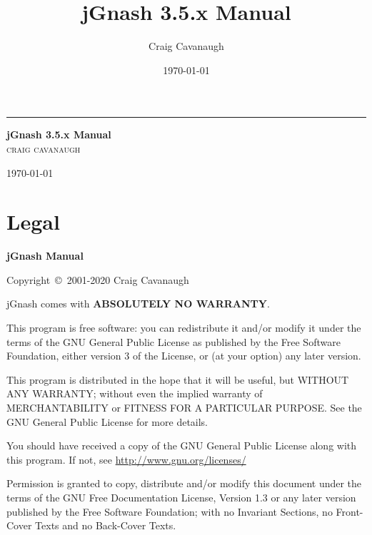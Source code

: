 \documentclass[letterpaper,12pt]{book}
\title{\textbf{jGnash 3.5.x Manual} }
\author{Craig Cavanaugh}
\date{\today}
\begin{document}
    \begin{titlepage}

        \raggedleft %

        {\color{gray} \rule{4pt}{\textheight}} %
        \hspace{0.08\textwidth} %
        \parbox[b]{0.75\textwidth}{ %

        {\Huge\bfseries jGnash 3.5.x Manual}\\[2\baselineskip] %
        {\Large\textsc{craig cavanaugh}}

        \vspace{0.5\textheight} %

        {\noindent \today}\\[\baselineskip] %
        }

    \end{titlepage}

    \tableofcontents
    
    \chapter{Legal}\label{ch:legal}
    {\bfseries jGnash Manual}

    Copyright~\copyright~2001-2020 Craig Cavanaugh

    jGnash comes with \textbf{ABSOLUTELY NO WARRANTY}.

    This program is free software: you can redistribute it and/or modify it under the terms of the GNU General Public
    License as published by the Free Software Foundation, either version 3 of the License, or (at your option) any later version.

    This program is distributed in the hope that it will be useful, but WITHOUT ANY WARRANTY; without even the implied
    warranty of MERCHANTABILITY or FITNESS FOR A PARTICULAR PURPOSE. See the GNU General Public License for more details.

    You should have received a copy of the GNU General Public License along with this program.
    If not, see \href{http://www.gnu.org/licenses/}{http://www.gnu.org/licenses/}

    Permission is granted to copy, distribute and/or modify this document under the terms of the GNU Free Documentation
    License, Version 1.3 or any later version published by the Free Software Foundation; with no Invariant Sections,
    no Front-Cover Texts and no Back-Cover Texts.
\end{document}
